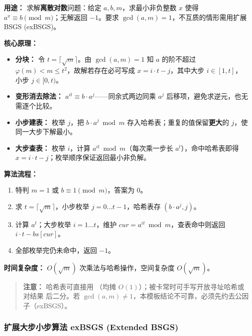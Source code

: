 \textbf{用途：}
求解\textbf{离散对数}问题：给定 $a, b, m$，求最小非负整数 $x$ 使得 $a^{x} \equiv b \pmod{m}$；无解返回 $-1$。要求 $\gcd(a, m) = 1$，不互质的情形需用扩展 BSGS (exBSGS)。

\textbf{核心原理：}

\begin{itemize}
  \item \textbf{分块：} 令 $t = \lceil \sqrt{m} \rceil$。由 $\gcd(a, m)=1$ 知 $a$ 的阶不超过 $\varphi(m) < m \le t^2$，故解若存在必可写成 $x = i \cdot t - j$，其中大步 $i \in [1, t]$，小步 $j \in [0, t)$。
  \item \textbf{变形消去除法：} $a^{it} \equiv b \cdot a^{j}$——同余式两边同乘 $a^j$ 后移项，避免求逆元，也无需逐个比较。
  \item \textbf{小步建表：} 枚举 $j$，把 $b \cdot a^j \bmod m$ 存入哈希表；重复的值保留\textbf{更大}的 $j$，使同一大步下解最小。
  \item \textbf{大步查表：} 枚举 $i$，计算 $a^{it} \bmod m$（每次乘一步长 $a^t$），命中哈希表即得 $x = i \cdot t - j$；枚举顺序保证返回最小非负解。
\end{itemize}

\textbf{算法流程：}

\begin{enumerate}
  \item 特判 $m = 1$ 或 $b \equiv 1 \pmod m$，答案为 $0$。
  \item 求 $t = \lceil \sqrt{m} \rceil$，小步枚举 $j = 0 \dots t-1$，哈希表存 $(b \cdot a^j, j)$。
  \item 计算 $a^t$；大步枚举 $i = 1 \dots t$，维护 $cur = a^{it} \bmod m$，查表命中则返回 $i \cdot t - \mathit{bs}[cur]$。
  \item 全部枚举完仍未命中，返回 $-1$。
\end{enumerate}

\textbf{时间复杂度：} $O(\sqrt{m})$ 次乘法与哈希操作，空间复杂度 $O(\sqrt{m})$。



\begin{quote}
\textbf{注意：} 哈希表可直接用 （均摊 $O(1)$）；被卡常时可手写开放寻址哈希或对结果  后二分。若 $\gcd(a, m) \ne 1$，本模板结论不可靠，必须先约去公因子（exBSGS）。
\end{quote}

\subsubsection{扩展大步小步算法 exBSGS (Extended BSGS)}

